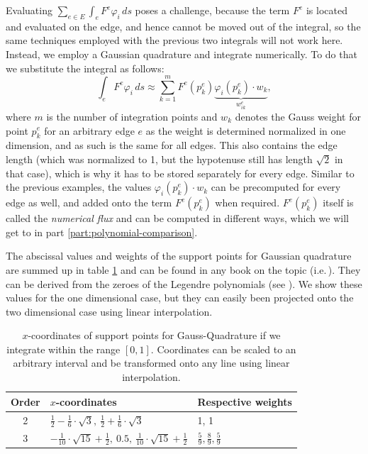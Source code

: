 \documentclass{article}
\renewcommand{\phi}{\varphi}
\begin{document}
Evaluating $\sum_{e \in E} \int_{e} F^e \phi_i \, ds$ poses a challenge, because the term $F^e$ is located and evaluated on the edge, and hence cannot be moved out of the integral, so the same techniques employed with the previous two integrals will not work here. Instead, we employ a Gaussian quadrature and integrate numerically. To do that we substitute the integral as follows:
\begin{equation}
  \int_{e} F^e \phi_i \, ds \approx \sum_{k=1}^{m} F^e\left(p_k^e\right) \underbrace{\phi_i\left(p_k^e\right) \cdot w_k}_{w_{ik}^e},
\end{equation}
where $m$ is the number of integration points and $w_k$ denotes the Gauss weight for point $p_k^e$ for an arbitrary edge $e$ as the weight is determined normalized in one dimension, and as such is the same for all edges. This also contains the edge length (which was normalized to 1, but the hypotenuse still has length $\sqrt{2}$ in that case), which is why it has to be stored separately for every edge. Similar to the previous examples, the values $\phi_i\left(p_k^e\right) \cdot w_k$ can be precomputed for every edge as well, and added onto the term $F^e\left(p_k^e\right)$ when required. $F^e\left(p_k^e\right)$ itself is called the \emph{numerical flux} and can be computed in different ways, which we will get to in part \ref{part:polynomial-comparison}.

The abscissal values and weights of the support points for Gaussian quadrature are summed up in table \ref{tab:x-coordinates-gauss-quadrature} and can be found in any book on the topic (i.e.\,\cite{hans2009schwarz}). They can be derived from the zeroes of the Legendre polynomials (see \cite{abramowitzstegun1964handbook}). We show these values for the one dimensional case, but they can easily been projected onto the two dimensional case using linear interpolation.

\begin{table}[ht]
  \renewcommand\arraystretch{1.5}
  \centering
  \begin{tabular}[ht]{cll}
    Order & $x$-coordinates & Respective weights \\
    \hline
    2 & $\frac{1}{2}-\frac{1}{6}\cdot \sqrt{3},\  \frac{1}{2}+\frac{1}{6}\cdot \sqrt{3}$ & 1, 1\\
    3 & $-\frac{1}{10}\cdot \sqrt{15}+\frac{1}{2} ,\  0.5,\  \frac{1}{10}\cdot \sqrt{15}+\frac{1}{2}$ & $\frac{5}{9}, \frac{8}{9}, \frac{5}{9}$ \\
    \hline
  \end{tabular}
  \caption{$x$-coordinates of support points for Gauss-Quadrature if we integrate within the range $\left[ 0,1 \right]$. Coordinates can be scaled to an arbitrary interval and be transformed onto any line using linear interpolation.}
  \label{tab:x-coordinates-gauss-quadrature}
\end{table}
\end{document}

